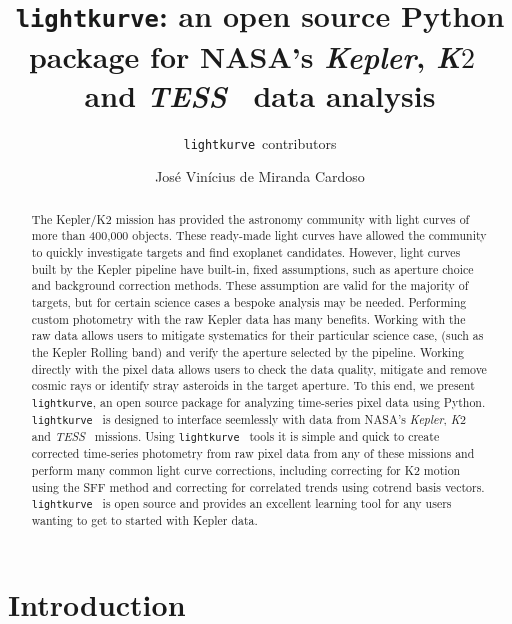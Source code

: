 \documentclass[twocolumn]{aastex62}
\newcommand{\ktwo}{{\it K$\mathit{2}$}}
\newcommand{\tess}{{\it TESS}}
\newcommand{\kepler}{{\it Kepler}}
\newcommand{\lightkurve}{\texttt{lightkurve}}
\begin{document}
\title{\lightkurve: an open source Python package for NASA's \kepler, \ktwo~ and \tess~ data analysis}


\author{\lightkurve~contributors}

\author{Jos\'e Vin\'icius de Miranda Cardoso}

\begin{abstract}
    The Kepler/K2 mission has provided the astronomy community with light curves of more than 400,000 objects.
    These ready-made light curves have allowed the community to quickly investigate targets and find exoplanet
    candidates. However, light curves built by the Kepler pipeline have built-in, fixed assumptions, such as
    aperture choice and background correction methods. These assumption are valid for the majority of targets,
    but for certain science cases a bespoke analysis may be needed. Performing custom photometry with the raw
    Kepler data has many benefits. Working with the raw data allows users to mitigate systematics for their
    particular science case, (such as the Kepler Rolling band) and verify the aperture selected by the pipeline.
    Working directly with the pixel data allows users to check the data quality, mitigate and remove cosmic
    rays or identify stray asteroids in the target aperture. To this end, we present \lightkurve, an open
    source package for analyzing time-series pixel data using Python. \lightkurve~ is designed to interface
    seemlessly with data from NASA's \kepler, \ktwo~ and \tess~ missions. Using \lightkurve~ tools it is
    simple and quick to create corrected time-series photometry from raw pixel data from any of these
    missions and perform many common light curve corrections, including correcting for K2 motion using
    the SFF method and correcting for correlated trends using cotrend basis vectors.
    \lightkurve~ is open source and provides an excellent learning tool for any users wanting
    to get to started with Kepler data.
\end{abstract}


\section{Introduction} \label{sec:intro}
\end{document}
